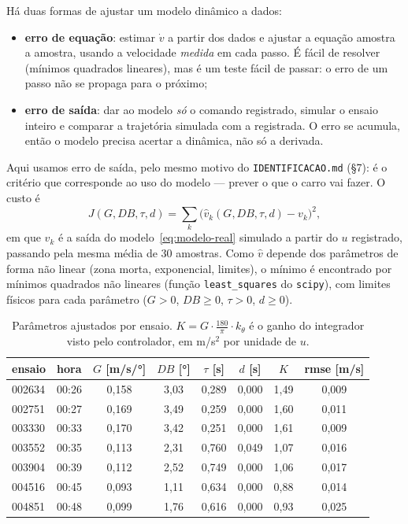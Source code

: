 \documentclass[11pt,a4paper,oneside,openany]{book}
\newcommand{\code}[1]{\texttt{#1}}
\begin{document}
Há duas formas de ajustar um modelo dinâmico a dados:
\begin{itemize}\itemsep0pt
  \item \textbf{erro de equação}: estimar $\dot v$ a partir dos dados e ajustar a equação
    amostra a amostra, usando a velocidade \emph{medida} em cada passo. É fácil de
    resolver (mínimos quadrados lineares), mas é um teste fácil de passar: o erro de um
    passo não se propaga para o próximo;
  \item \textbf{erro de saída}: dar ao modelo \emph{só} o comando registrado, simular o
    ensaio inteiro e comparar a trajetória simulada com a registrada. O erro se acumula,
    então o modelo precisa acertar a dinâmica, não só a derivada.
\end{itemize}

Aqui usamos erro de saída, pelo mesmo motivo do \code{IDENTIFICACAO.md} (§7): é o
critério que corresponde ao uso do modelo --- prever o que o carro vai fazer. O custo é
\begin{equation}
  J(G, DB, \tau, d) = \sum_k \big(\hat v_k(G, DB, \tau, d) - v_k\big)^2,
\end{equation}
em que $\hat v_k$ é a saída do modelo~\eqref{eq:modelo-real} simulado a partir do $u$
registrado, passando pela mesma média de 30 amostras. Como $\hat v$ depende dos parâmetros
de forma não linear (zona morta, exponencial, limites), o mínimo é encontrado por mínimos
quadrados não lineares (função \code{least\_squares} do \code{scipy}), com limites físicos para
cada parâmetro ($G > 0$, $DB \ge 0$, $\tau > 0$, $d \ge 0$).

\begin{table}[ht]
\centering\small
\caption{Parâmetros ajustados por ensaio. $K = G\cdot\frac{180}{\pi}\cdot k_\theta$ é o
ganho do integrador visto pelo controlador, em m/s$^2$ por unidade de $u$.}
\label{tab:param}
\begin{tabular}{llccccc c}
\toprule
ensaio & hora & $G$ [m/s/°] & $DB$ [°] & $\tau$ [s] & $d$ [s] & $K$ & rmse [m/s]\\
\midrule
002634 & 00:26 & 0,158 & 3,03 & 0,289 & 0,000 & 1,49 & 0,009\\
002751 & 00:27 & 0,169 & 3,49 & 0,259 & 0,000 & 1,60 & 0,011\\
003330 & 00:33 & 0,170 & 3,42 & 0,251 & 0,000 & 1,61 & 0,009\\
\midrule
003552 & 00:35 & 0,113 & 2,31 & 0,760 & 0,049 & 1,07 & 0,016\\
003904 & 00:39 & 0,112 & 2,52 & 0,749 & 0,000 & 1,06 & 0,017\\
004516 & 00:45 & 0,093 & 1,11 & 0,634 & 0,000 & 0,88 & 0,014\\
004851 & 00:48 & 0,099 & 1,76 & 0,616 & 0,000 & 0,93 & 0,025\\
\bottomrule
\end{tabular}
\end{table}
\end{document}

